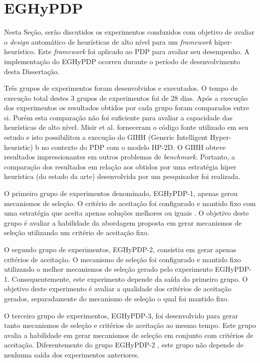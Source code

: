\section{EGHyPDP}

Nesta Seção, serão discutidos  os experimentos conduzidos com objetivo de avaliar o \textit{design} automático de heurísticas de alto nível para um \textit{framework} hiper-heurístico. Este \textit{framework} foi aplicado ao PDP para avaliar seu desempenho. A implementação do EGHyPDP ocorreu durante o período de desenvolvimento desta Dissertação. 


Três grupos de experimentos foram desenvolvidos e executados. O tempo de execução total destes 3 grupos de experimentos foi de 28 dias. Após a execução dos experimentos os resultados obtidos por cada grupo foram comparados entre si. Porém esta comparação não foi suficiente para avaliar a capacidade das heurísticas de alto nível. Misir et al. forneceram o código fonte utilizado em seu estudo e isto possibilitou a execução do GIHH (Generic Intelligent Hyper-heuristic) \cite{misir2012intelligent}b no contexto do PDP com o modelo HP-2D. O GIHH obteve resultados impressionantes em outros problemas de \textit{benchmark}. Portanto, a comparação dos resultados em relação aos obtidos por uma estratégia hiper heurística (do estado da arte) desenvolvida por um pesquisador foi realizada. 

O primeiro grupo de experimentos denominado, EGHyPDP-1, apenas gerou mecanismos de seleção. O critério de aceitação foi configurado e mantido fixo com uma estratégia que aceita apenas soluções melhores ou iguais \cite{burke2013hyper}. O objetivo deste grupo é avaliar a habilidade da abordagem proposta em gerar mecanismos de seleção utilizando um critério de aceitação fixo.

	O segundo grupo de experimentos, EGHyPDP-2, consistiu em gerar apenas critérios de aceitação. O mecanismo de seleção foi configurado e mantido fixo utilizando o melhor mecanismos de seleção gerado pelo experimento EGHyPDP-1. Consequentemente, este experimento depende da saída do primeiro grupo. O objetivo deste experimento é avaliar a qualidade dos critérios de aceitação gerados, separadamente do mecanismo de seleção o qual foi mantido fixo.
	
	O terceiro grupo de experimentos,  EGHyPDP-3, foi desenvolvido para gerar tanto mecanismos de seleção e critérios de aceitação ao mesmo tempo. Este grupo avalia a habilidade em gerar mecanismos de seleção em conjunto com critérios de aceitação. Diferentemente do grupo EGHyPDP-2  , este grupo não depende de nenhuma saída dos experimentos anteriores.


